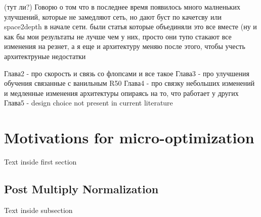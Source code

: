 (тут ли?)
Говорю о том что в последнее время появилось много малненьких улучшений, которые не замедляют сеть, но дают буст по качетсву \cite{zhang2019making_aa_shift_invariant} или space2depth  \cite{ridnik2021_tresnet} в начале сети. были статья которые объединяли это все вместе \cite{lee2020compounding_improvements} \cite{bello2021revisiting_resnet} (ну и как бы мои результаты не лучше чем у них, просто они тупо стакают все изменения на резнет, а я еще и архитектуру меняю после этого, чтобы учесть архитектруные недостатки


Глава2 - про скорость и связь со флопсами и все такое
Глава3 - про улучшения обучения связанные с ванильным R50
Глава4 - про связку небольших изменений и медленные изменения архитектуры опираясь на то, что работает у других
Глава5 - design choice not present in current literature


\section{Motivations for micro-optimization}

Text inside first section

\subsection{Post Multiply Normalization}

Text inside subsection
